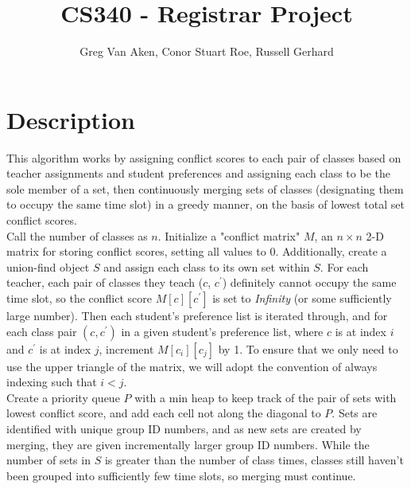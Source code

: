 \documentclass[11pt, oneside]{article}   	%
\title{CS340 - Registrar Project}
\author{Greg Van Aken, Conor Stuart Roe, Russell Gerhard}
\begin{document}
\maketitle

\section{Description}
This algorithm works by assigning conflict scores to each pair of classes based on teacher assignments and student preferences and assigning each class to be the sole member of a set, then continuously merging sets of classes (designating them to occupy the same time slot) in a greedy manner, on the basis of lowest total set conflict scores. \\

Call the number of classes as $n$. Initialize a "conflict matrix" $M$, an $n \times n$ 2-D matrix for storing conflict scores, setting all values to 0. Additionally, create a union-find object $S$ and assign each class to its own set within $S$. For each teacher, each pair of classes they teach ($c$, $c^\prime$) definitely cannot occupy the same time slot, so the conflict score $M[c][c^\prime]$ is set to {\it Infinity} (or some sufficiently large number). Then each student's preference list is iterated through, and for each class pair $(c, c^\prime)$ in a given student's preference list, where $c$ is at index $i$ and $c^\prime$ is at index $j$, increment $M[c_i][c_j]$  by 1. To ensure that we only need to use the upper triangle of the matrix, we will adopt the convention of always indexing such that $i < j$. \\

Create a priority queue $P$ with a min heap to keep track of the pair of sets with lowest conflict score, and add each cell not along the diagonal to $P$. Sets are identified with unique group ID numbers, and as new sets are created by merging, they are given incrementally larger group ID numbers. While the number of sets in $S$ is greater than the number of class times, classes still haven't been grouped into sufficiently few time slots, so merging must continue. \\
\end{document}
